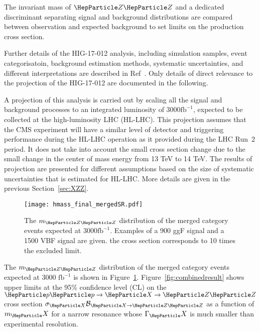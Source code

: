 The invariant mass of $\PZ \PZ$ and a dedicated discriminant separating signal and background distributions are compared between observation and expected background to set limits on the production cross section. 

Further details of the HIG-17-012 analysis, including simulation samples, event categorisatoin, background estimation methods, systematic uncertainties, and different interpretations are described in Ref~\cite{Sirunyan:2018qlb}. Only details of direct relevance to the projection of the HIG-17-012 are documented in the following.


A projection of this analysis is carried out by scaling all the signal
and background processes to an integrated luminosity of 3000$\mathrm{fb}^{-1}$, expected to be collected at the high-luminosity LHC (HL-LHC). This projection assumes that the CMS experiment will have a similar level of detector and triggering performance during the HL-LHC operation as it provided during the LHC Run~2 period. It does not take into account the small cross section change due to the small change in the center of mass energy from 13 TeV to 14 TeV. The results of projection are presented for different assumptions based on the size of systematic uncertainties that is estimated for HL-LHC. More details are given in the previous Section~\ref{sec:XZZ}.

\begin{figure}[htbp]
        \centering
                \texttt{[image: hmass\_final\_mergedSR.pdf]}
                \caption{The $m_{\PZ\PZ}$ distribution of the merged category events expected at 3000$\mathrm{fb}^{-1}$. Examples of a 900 \UGeV ggF signal and a 1500 \UGeV VBF signal are given. the cross section corresponds to 10 times the excluded limit. 
        \label{fig:mzz}
        }
            \end{figure}
The $m_{\PZ\PZ}$ distribution of the merged category events expected at 3000 $\mathrm{fb}^{-1}$ is shown in Figure~\ref{fig:mzz}. Figure~\ref{fig:combinedresult} shows upper limits at the 95\% confidence level (CL) on the $\Pp\Pp\to\PX\to\PZ\PZ$ cross section
$\sigma_{\PX} \mathcal{B}_{{\PX}\to\PZ\PZ}$ as a function of $m_\PX$ for a narrow resonance whose $\Gamma_\PX$ is much smaller than experimental resolution.

